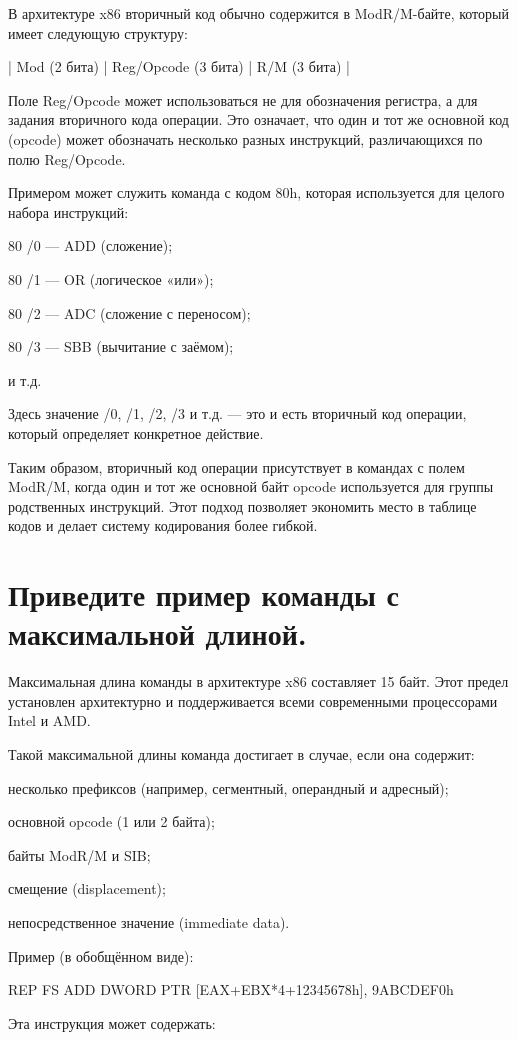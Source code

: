 В архитектуре x86 вторичный код обычно содержится в ModR/M-байте, который имеет следующую структуру:

| Mod (2 бита) | Reg/Opcode (3 бита) | R/M (3 бита) |


Поле Reg/Opcode может использоваться не для обозначения регистра, а для задания вторичного кода операции. Это означает, что один и тот же основной код (opcode) может обозначать несколько разных инструкций, различающихся по полю Reg/Opcode.

Примером может служить команда с кодом 80h, которая используется для целого набора инструкций:

80 /0 — ADD (сложение);

80 /1 — OR (логическое «или»);

80 /2 — ADC (сложение с переносом);

80 /3 — SBB (вычитание с заёмом);

и т.д.

Здесь значение /0, /1, /2, /3 и т.д. — это и есть вторичный код операции, который определяет конкретное действие.

Таким образом, вторичный код операции присутствует в командах с полем ModR/M, когда один и тот же основной байт opcode используется для группы родственных инструкций. Этот подход позволяет экономить место в таблице кодов и делает систему кодирования более гибкой.


\section{Приведите пример команды с максимальной длиной.}

Максимальная длина команды в архитектуре x86 составляет 15 байт. Этот предел установлен архитектурно и поддерживается всеми современными процессорами Intel и AMD.

Такой максимальной длины команда достигает в случае, если она содержит:

несколько префиксов (например, сегментный, операндный и адресный);

основной opcode (1 или 2 байта);

байты ModR/M и SIB;

смещение (displacement);

непосредственное значение (immediate data).

Пример (в обобщённом виде):

REP FS ADD DWORD PTR [EAX+EBX*4+12345678h], 9ABCDEF0h

Эта инструкция может содержать:

